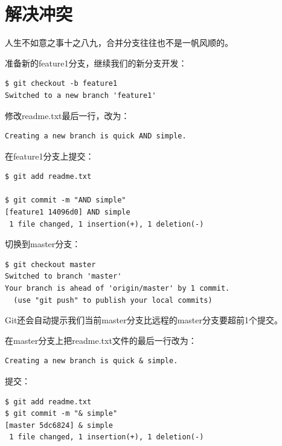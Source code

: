 \section{解决冲突}
人生不如意之事十之八九，合并分支往往也不是一帆风顺的。

准备新的feature1分支，继续我们的新分支开发：

\begin{verbatim}
$ git checkout -b feature1
Switched to a new branch 'feature1'
\end{verbatim}

修改readme.txt最后一行，改为：

\begin{verbatim}
Creating a new branch is quick AND simple.
\end{verbatim}

在feature1分支上提交：

\begin{verbatim}
$ git add readme.txt

$ git commit -m "AND simple"
[feature1 14096d0] AND simple
 1 file changed, 1 insertion(+), 1 deletion(-)
\end{verbatim}

切换到master分支：

\begin{verbatim}
$ git checkout master
Switched to branch 'master'
Your branch is ahead of 'origin/master' by 1 commit.
  (use "git push" to publish your local commits)
\end{verbatim}

Git还会自动提示我们当前master分支比远程的master分支要超前1个提交。

在master分支上把readme.txt文件的最后一行改为：

\begin{verbatim}
Creating a new branch is quick & simple.
\end{verbatim}

提交：

\begin{verbatim}
$ git add readme.txt 
$ git commit -m "& simple"
[master 5dc6824] & simple
 1 file changed, 1 insertion(+), 1 deletion(-)
\end{verbatim}

